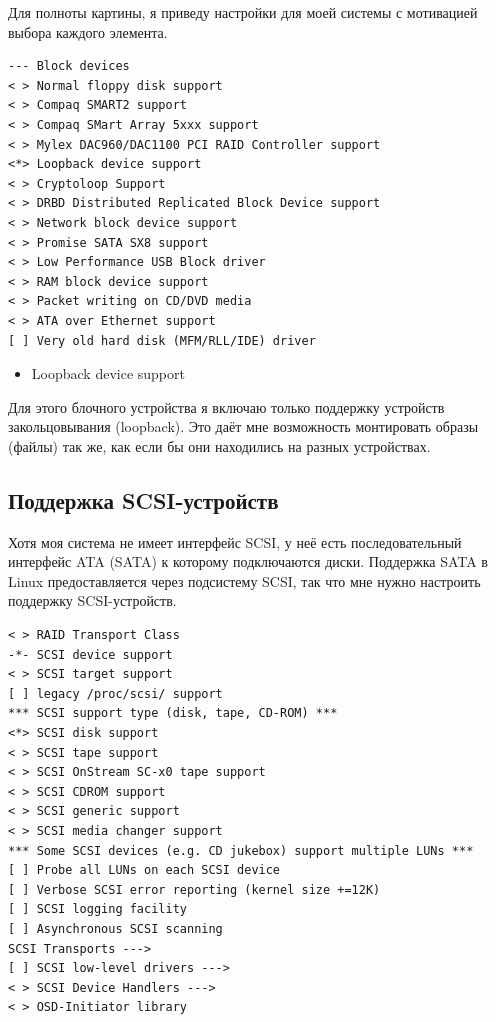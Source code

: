 \documentclass[10pt]{book}
\begin{document}
Для полноты картины, я приведу настройки для моей системы с мотивацией  выбора каждого элемента.

\vspace{3mm}
\begin{tcolorbox}[colback=gray!14!white, colframe=blue!75!blue]
\begin{lstlisting}
--- Block devices
< > Normal floppy disk support
< > Compaq SMART2 support
< > Compaq SMart Array 5xxx support
< > Mylex DAC960/DAC1100 PCI RAID Controller support
<*> Loopback device support
< > Cryptoloop Support
< > DRBD Distributed Replicated Block Device support
< > Network block device support
< > Promise SATA SX8 support
< > Low Performance USB Block driver
< > RAM block device support
< > Packet writing on CD/DVD media
< > ATA over Ethernet support
[ ] Very old hard disk (MFM/RLL/IDE) driver
\end{lstlisting}
\end{tcolorbox}

\begin{itemize}
\item Loopback device support
\end{itemize}

Для этого блочного устройства я включаю только поддержку устройств закольцовывания (loopback). Это даёт мне возможность монтировать образы (файлы) так же, как если бы они находились на разных устройствах.

\subsection{Поддержка SCSI-устройств}

Хотя моя система не имеет интерфейс SCSI, у неё есть последовательный интерфейс ATA (SATA) к которому подключаются диски. Поддержка SATA в Linux предоставляется через подсистему SCSI, так что мне нужно настроить поддержку SCSI-устройств.

\vspace{3mm}
\begin{tcolorbox}[colback=gray!14!white, colframe=blue!75!blue]
\begin{lstlisting}
< > RAID Transport Class
-*- SCSI device support
< > SCSI target support
[ ] legacy /proc/scsi/ support
*** SCSI support type (disk, tape, CD-ROM) ***
<*> SCSI disk support
< > SCSI tape support
< > SCSI OnStream SC-x0 tape support
< > SCSI CDROM support
< > SCSI generic support
< > SCSI media changer support
*** Some SCSI devices (e.g. CD jukebox) support multiple LUNs ***
[ ] Probe all LUNs on each SCSI device
[ ] Verbose SCSI error reporting (kernel size +=12K)
[ ] SCSI logging facility
[ ] Asynchronous SCSI scanning
SCSI Transports --->
[ ] SCSI low-level drivers --->
< > SCSI Device Handlers --->
< > OSD-Initiator library
\end{lstlisting}
\end{tcolorbox}
\end{document}
